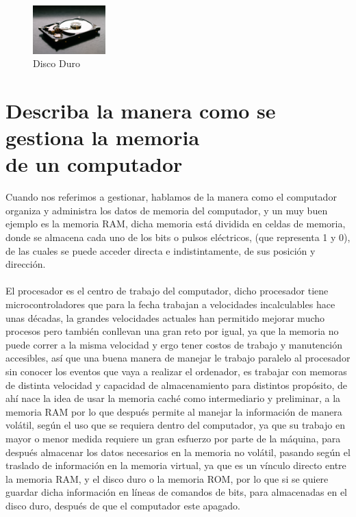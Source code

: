 \documentclass{article}
\begin{document}
	\begin{figure}
	 \centering
	 \includegraphics[width=0.25\textwidth]{rom.jpg}
	 \caption{Disco Duro}
	 \label{rom}
	 \end{figure}
	
	\section{Describa la manera como se gestiona la memoria\\de un computador} \label{describa}
	Cuando nos referimos a gestionar, hablamos de la manera como el computador organiza y administra los datos de memoria del computador, y un muy buen ejemplo es la memoria RAM, dicha memoria está dividida en celdas de memoria, donde se almacena cada uno de los bits o pulsos eléctricos, (que representa 1 y 0), de las cuales se puede acceder directa e indistintamente, de sus posición y dirección.\cite{monografias}
	\\\\
	El procesador es el centro de trabajo del computador, dicho procesador tiene microcontroladores que para la fecha trabajan a velocidades incalculables hace unas décadas, la grandes velocidades actuales han permitido mejorar mucho procesos pero también conllevan una gran reto por igual, ya que la memoria no puede correr a la misma velocidad y ergo tener costos de trabajo y manutención accesibles, así que una buena manera de manejar le trabajo paralelo al procesador sin conocer los eventos que vaya a realizar el ordenador, \cite{youbioit} es trabajar con memoras de distinta velocidad y capacidad de almacenamiento para distintos propósito, de ahí nace la idea de usar la memoria caché como intermediario y preliminar, a la memoria RAM por lo que después permite al manejar la información de manera volátil, según el uso que se requiera dentro del computador, ya que su trabajo en mayor o menor medida requiere un gran esfuerzo por parte de la máquina, para después almacenar los datos necesarios en la memoria no volátil, pasando según el traslado de información en la memoria virtual, ya que es un vínculo directo entre la memoria RAM, y el disco duro o la memoria ROM, por lo que si se quiere guardar dicha información en líneas de comandos de bits, para almacenadas en el disco duro, después de que el computador este apagado.
\end{document}
